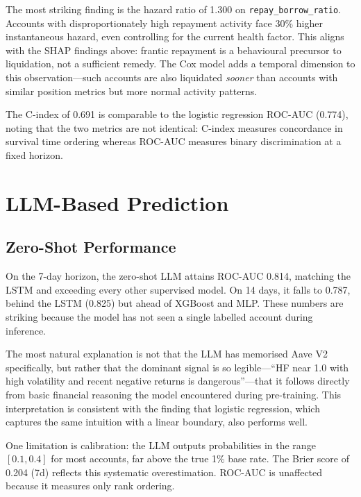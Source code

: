 \documentclass[12pt,a4paper]{article}
\begin{document}
The most striking finding is the hazard ratio of 1.300 on
\texttt{repay\_borrow\_ratio}.  Accounts with disproportionately high
repayment activity face 30\% higher instantaneous hazard, even controlling
for the current health factor.  This aligns with the SHAP findings above:
frantic repayment is a behavioural precursor to liquidation, not a
sufficient remedy.  The Cox model adds a temporal dimension to this
observation---such accounts are also liquidated \emph{sooner} than accounts
with similar position metrics but more normal activity patterns.

The C-index of 0.691 is comparable to the logistic regression ROC-AUC
(0.774), noting that the two metrics are not identical: C-index measures
concordance in survival time ordering whereas ROC-AUC measures binary
discrimination at a fixed horizon.

\clearpage

\section{LLM-Based Prediction}
\label{sec:llm}

\subsection{Zero-Shot Performance}

On the 7-day horizon, the zero-shot LLM attains ROC-AUC 0.814, matching
the LSTM and exceeding every other supervised model.  On 14 days, it falls
to 0.787, behind the LSTM (0.825) but ahead of XGBoost and MLP.  These
numbers are striking because the model has not seen a single labelled
account during inference.

The most natural explanation is not that the LLM has memorised Aave V2
specifically, but rather that the dominant signal is so legible---``HF near
1.0 with high volatility and recent negative returns is dangerous''---that
it follows directly from basic financial reasoning the model encountered
during pre-training.  This interpretation is consistent with the finding
that logistic regression, which captures the same intuition with a linear
boundary, also performs well.

One limitation is calibration: the LLM outputs probabilities in the range
$[0.1, 0.4]$ for most accounts, far above the true 1\% base rate.  The
Brier score of 0.204 (7d) reflects this systematic overestimation.  ROC-AUC
is unaffected because it measures only rank ordering.
\end{document}
